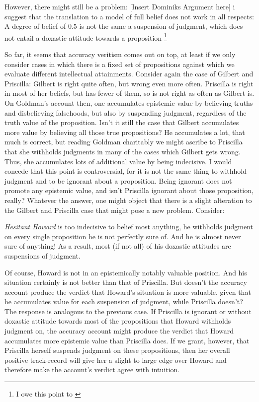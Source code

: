 \documentclass[12pt,numbers=noenddot]{scrartcl}
\begin{document}
However, there might still be a problem: [Insert Dominiks Argument here] i suggest that the translation to a model of full belief does not work in all respects: A degree of belief of 0.5 is not the same a suspension of judgment, which does not entail a doxastic attitude towards a proposition \footnote{I owe this point to \textcite{Balg2018} }

So far, it seems that accuracy veritism comes out on top, at least if we only consider cases in which there is a fixed set of propositions against which we evaluate different intellectual attainments. Consider again the case of Gilbert and Priscilla: Gilbert is right quite often, but wrong even more often. Priscilla is right in most of her beliefs, but has fewer of them, so is not right as often as Gilbert is. On Goldman's account then, one accumulates epistemic value by believing truths and disbelieving falsehoods, but also by suspending judgment, regardless of the truth value of the proposition. Isn't it still the case that Gilbert accumulates more value by believing all those true propositions? He accumulates a lot, that much is correct, but reading Goldman charitably we might ascribe to Priscilla that she withholds judgments in many of the cases which Gilbert gets wrong. Thus, she accumulates lots of additional value by being indecisive. I would concede that this point is controversial, for it is not the same thing to withhold judgment and to be ignorant about a proposition. Being ignorant does not promote any epistemic value, and isn't Priscilla ignorant about those proposition, really? Whatever the answer, one might object that there is a slight alteration to the Gilbert and Priscilla case that might pose a new problem. Consider:

\begin{description}
    \item \emph{Hesitant Howard} is too indecisive to belief most anything, he withholds judgment on every single proposition he is not perfectly sure of. And he is almost never sure of anything! As a result, most (if not all) of his doxastic attitudes are suspensions of judgment.
\end{description}

Of course, Howard is not in an epistemically notably valuable position. And his situation certainly is not better than that of Priscilla. But doesn't the accuracy account produce the verdict that Howard's situation is more valuable, given that he accumulates value for each suspension of judgment, while Priscilla doesn't? The response is analogous to the previous case. If Priscilla is ignorant or without doxastic attitude towards most of the propositions that Howard withholds judgment on, the accuracy account might produce the verdict that Howard accumulates more epistemic value than Priscilla does. If we grant, however, that Priscilla herself suspends judgment on these propositions, then her overall positive track-record will give her a slight to large edge over Howard and therefore make the account's verdict agree with intuition.
\end{document}
